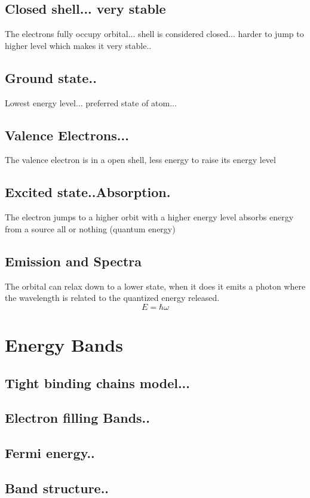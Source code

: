 \documentclass[prl,onecolumn]{revtex4-1}  %
\begin{document}
\subsection*{Closed shell... very stable}
The electrons fully occupy orbital... shell is considered closed... harder to jump to higher level which makes it very stable..  
\subsection*{Ground state..}
Lowest energy level... preferred state of atom... 
\subsection*{Valence Electrons...}
The valence electron is in a open shell, less energy to raise its energy level
\subsection*{Excited state..Absorption.}
The electron jumps to a higher orbit with a higher energy level
absorbs energy from a source all or nothing (quantum energy)


\subsection*{Emission and Spectra}
The orbital can relax down to a lower state, when it does it emits a photon where the wavelength is related to the quantized energy released.
\begin{equation}
E = \hbar \omega
\end{equation}

\section{Energy Bands}

\subsection*{Tight binding chains model...}
\lipsum[1-1]
\subsection*{Electron filling Bands..}
\lipsum[1-1]
\subsection*{Fermi energy..}
\lipsum[1-1]
\subsection*{Band structure..}
\lipsum[1-1]
\end{document}
